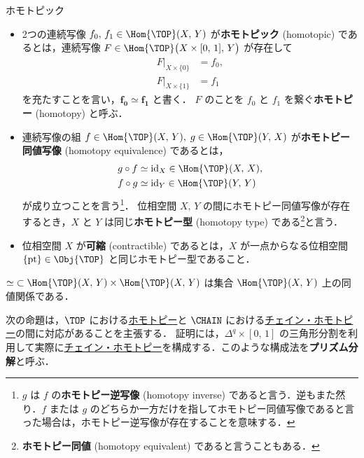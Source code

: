 \documentclass[algtopo_main]{subfiles}
\begin{document}
\begin{mydef}[label=def:homotopic, breakable]{ホモトピック}
    \begin{itemize}
        \item 2つの連続写像 $f_0,\, f_1 \in \Hom{\TOP}(X,\, Y)$ が\textbf{ホモトピック} (homotopic) であるとは，連続写像 $F \in \Hom{\TOP}\bigl( X \times [0,\, 1],\,  Y \bigr)$ が存在して
        \begin{align}
            F|_{X \times \{0\}} &= f_0, \\
            F|_{X \times \{1\}} &= f_1
        \end{align}
        を充たすことを言い，$\bm{f_0 \simeq f_1}$ と書く．
        $F$ のことを $f_0$ と $f_1$ を繋ぐ\textbf{ホモトピー} (homotopy) と呼ぶ．
        \item 連続写像の組 $f \in \Hom{\TOP}(X,\, Y),\; g \in \Hom{\TOP}(Y,\, X)$ が\textbf{ホモトピー同値写像} (homotopy equivalence) であるとは，
        \begin{align}
            g \circ f&\simeq \mathrm{id}_X \in \Hom{\TOP}(X,\, X), \\
            f \circ g&\simeq \mathrm{id}_Y \in \Hom{\TOP}(Y,\, Y)
        \end{align}
        が成り立つことを言う\footnote{$g$ は $f$ の\textbf{ホモトピー逆写像} (homotopy inverse) であると言う．逆もまた然り．$f$ または $g$ のどちらか一方だけを指してホモトピー同値写像であると言った場合は，ホモトピー逆写像が存在することを意味する．}．
        位相空間 $X,\, Y$ の間にホモトピー同値写像が存在するとき，$X$ と $Y$ は同じ\textbf{ホモトピー型} (homotopy type) である\footnote{\textbf{ホモトピー同値} (homotopy equivalent) であると言うこともある．}と言う．
        \item 位相空間 $X$ が\textbf{可縮} (contractible) であるとは，$X$ が一点からなる位相空間 $\{\mathrm{pt}\} \in \Obj{\TOP}$ と同じホモトピー型であること．
    \end{itemize}
\end{mydef}

$\simeq\;\subset \Hom{\TOP}(X,\, Y) \times \Hom{\TOP}(X,\, Y) $ は集合 $\Hom{\TOP}(X,\, Y)$ 上の同値関係である．

次の命題は，$\TOP$ における\hyperref[def:homotopic]{ホモトピー}と $\CHAIN$ における\hyperref[def:chainHomotopy]{チェイン・ホモトピー}の間に対応があることを主張する．
証明には，$\Delta^q \times [0,\, 1]$ の三角形分割を利用して実際に\hyperref[def:chainHomotopy]{チェイン・ホモトピー}を構成する．このような構成法を\textbf{プリズム分解}と呼ぶ．
\end{document}
